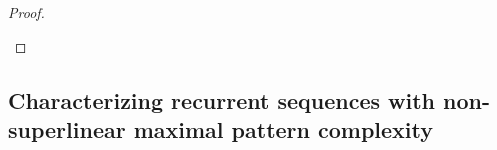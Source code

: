 \documentclass[11pt,reqno]{amsart}
\newtheorem{conjecture}[theorem]{Conjecture}
\newtheorem{lemma}[theorem]{Lemma}
\theoremstyle{definition}
\newtheorem{remark}[theorem]{Remark}
\theoremstyle{plain}
\newcommand{\AuthornoteA}[2]{{\sf\small\color{magenta}{[#1: #2]}}}
\newcommand{\AuthornoteR}[2]{{\sf\small\color{blue}{[#1: #2]}}}
\newcommand{\Anote}{\AuthornoteA{A}}
\newcommand{\rp}{\AuthornoteR{R}}
\begin{document}
\begin{proof}
\begin{enumerate}
    
    
\end{enumerate}
\end{proof}






\subsection{Characterizing recurrent sequences with non-superlinear maximal pattern complexity}
\end{document}
